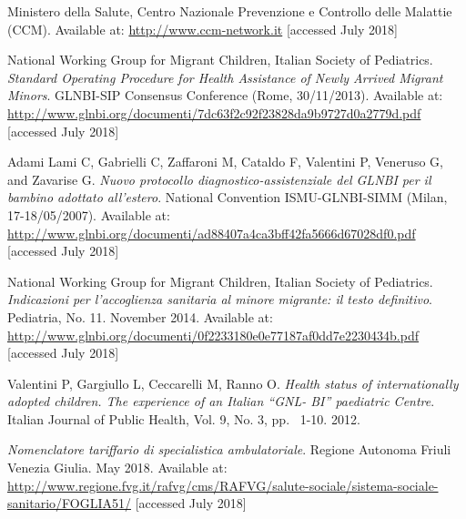 \begin{thebibliography}{50}
  Ministero della Salute, Centro Nazionale Prevenzione e Controllo delle Malattie (CCM).  
  Available at: \url{http://www.ccm-network.it} [accessed July 2018]
  
  National Working Group for Migrant Children, Italian Society of Pediatrics.
  \textit{Standard Operating Procedure for Health Assistance of Newly Arrived Migrant Minors}.
  GLNBI-SIP Consensus Conference (Rome, 30/11/2013).
  Available at: \url{http://www.glnbi.org/documenti/7dc63f2c92f23828da9b9727d0a2779d.pdf} [accessed July 2018]
  
  Adami Lami C, Gabrielli C, Zaffaroni M, Cataldo F, Valentini P, Veneruso G, and Zavarise G.
  \textit{Nuovo protocollo diagnostico-assistenziale del GLNBI per il bambino adottato all'estero}.
   National Convention ISMU-GLNBI-SIMM (Milan, 17-18/05/2007).
  Available at: \url{http://www.glnbi.org/documenti/ad88407a4ca3bff42fa5666d67028df0.pdf} [accessed July 2018]
  
  National Working Group for Migrant Children, Italian Society of Pediatrics.
  \textit{Indicazioni per l’accoglienza sanitaria al minore migrante: il testo definitivo}.
  Pediatria, No. 11.
  November 2014.
  Available at: \url{http://www.glnbi.org/documenti/0f2233180e0e77187af0dd7e2230434b.pdf} [accessed July 2018]
  
  Valentini P, Gargiullo L, Ceccarelli M, Ranno O.
  \textit{Health status of internationally adopted children. The experience of an Italian “GNL- BI” paediatric Centre}.
  Italian Journal of Public Health, Vol. 9, No. 3,
  pp. ~1-10.
  2012.
  
  \textit{Nomenclatore tariffario di specialistica ambulatoriale}.
  Regione Autonoma Friuli Venezia Giulia.
  May 2018.
  Available at: \url{http://www.regione.fvg.it/rafvg/cms/RAFVG/salute-sociale/sistema-sociale-sanitario/FOGLIA51/} [accessed July 2018]

\end{thebibliography}